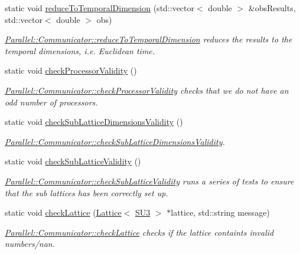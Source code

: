 \begin{DoxyCompactItemize}
static void \mbox{\hyperlink{class_parallel_1_1_communicator_a5d42989e7a3022de6042e3503aa35346}{reduce\+To\+Temporal\+Dimension}} (std\+::vector$<$ double $>$ \&obs\+Results, std\+::vector$<$ double $>$ obs)
\begin{DoxyCompactList}\small\item\em \mbox{\hyperlink{class_parallel_1_1_communicator_a5d42989e7a3022de6042e3503aa35346}{Parallel\+::\+Communicator\+::reduce\+To\+Temporal\+Dimension}} reduces the results to the temporal dimensions, i.\+e. Euclidean time. \end{DoxyCompactList}\item 
static void \mbox{\hyperlink{class_parallel_1_1_communicator_acd7e2f114728e5207093743a58ab3a40}{check\+Processor\+Validity}} ()
\begin{DoxyCompactList}\small\item\em \mbox{\hyperlink{class_parallel_1_1_communicator_acd7e2f114728e5207093743a58ab3a40}{Parallel\+::\+Communicator\+::check\+Processor\+Validity}} checks that we do not have an odd number of processors. \end{DoxyCompactList}\item 
static void \mbox{\hyperlink{class_parallel_1_1_communicator_a535fddf3fe091b82f8ca3de7974f7412}{check\+Sub\+Lattice\+Dimensions\+Validity}} ()
\begin{DoxyCompactList}\small\item\em \mbox{\hyperlink{class_parallel_1_1_communicator_a535fddf3fe091b82f8ca3de7974f7412}{Parallel\+::\+Communicator\+::check\+Sub\+Lattice\+Dimensions\+Validity}}. \end{DoxyCompactList}\item 
static void \mbox{\hyperlink{class_parallel_1_1_communicator_a5da7239eefebcebbeeabee499b2d724d}{check\+Sub\+Lattice\+Validity}} ()
\begin{DoxyCompactList}\small\item\em \mbox{\hyperlink{class_parallel_1_1_communicator_a5da7239eefebcebbeeabee499b2d724d}{Parallel\+::\+Communicator\+::check\+Sub\+Lattice\+Validity}} runs a series of tests to ensure that the sub lattices has been correctly set up. \end{DoxyCompactList}\item 
static void \mbox{\hyperlink{class_parallel_1_1_communicator_a9471bf9448f34a0b4575310a3c54af61}{check\+Lattice}} (\mbox{\hyperlink{class_lattice}{Lattice}}$<$ \mbox{\hyperlink{class_s_u3}{S\+U3}} $>$ $\ast$lattice, std\+::string message)
\begin{DoxyCompactList}\small\item\em \mbox{\hyperlink{class_parallel_1_1_communicator_a9471bf9448f34a0b4575310a3c54af61}{Parallel\+::\+Communicator\+::check\+Lattice}} checks if the lattice containts invalid numbers/nan. \end{DoxyCompactList}\end{DoxyCompactItemize}


